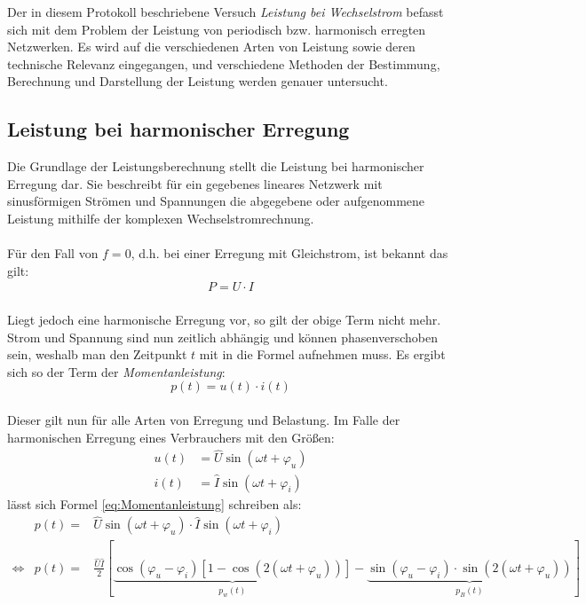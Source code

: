 
Der in diesem Protokoll beschriebene Versuch \textit{Leistung bei Wechselstrom} befasst sich mit dem Problem der Leistung von periodisch bzw. harmonisch erregten Netzwerken. Es wird auf die verschiedenen Arten von Leistung sowie deren technische Relevanz eingegangen, und verschiedene Methoden der Bestimmung, Berechnung und Darstellung der Leistung werden genauer untersucht.

\subsection{Leistung bei harmonischer Erregung}

Die Grundlage der Leistungsberechnung stellt die Leistung bei harmonischer Erregung dar. Sie beschreibt für ein gegebenes lineares Netzwerk mit sinusförmigen Strömen und Spannungen die abgegebene oder aufgenommene Leistung mithilfe der komplexen Wechselstromrechnung.\\
\\
Für den Fall von $f=0$, d.h. bei einer Erregung mit Gleichstrom, ist bekannt das gilt:
\begin{align*}
P=U\cdot I
\end{align*}
\\
Liegt jedoch eine harmonische Erregung vor, so gilt der obige Term nicht mehr. Strom und Spannung sind nun zeitlich abhängig und können phasenverschoben sein, weshalb man den Zeitpunkt $t$ mit in die Formel aufnehmen muss. Es ergibt sich so der Term der \textit{Momentanleistung}:
\begin{equation} \label{eq:Momentanleistung}
p(t)=u(t)\cdot i(t)
\end{equation}
\\
Dieser gilt nun für alle Arten von Erregung und Belastung. Im Falle der harmonischen Erregung eines Verbrauchers mit den Größen:
\begin{align*}
u(t) &= \hat{U}\sin(\omega t + \varphi_u)\\
i(t) &= \hat{I}\sin(\omega t + \varphi_i)
\end{align*}
lässt sich Formel \eqref{eq:Momentanleistung} schreiben als:
\begin{eqnarray}
&p(t)=&\hat{U}\sin(\omega t + \varphi_u) \cdot \hat{I}\sin(\omega t + \varphi_i) \nonumber \\
\Leftrightarrow & p(t) =&\frac{\hat{U}\hat{I}}{2}\left[\underbrace{\cos(\varphi_u-\varphi_i)[1-\cos(2(\omega t + \varphi_u))]}_{p_w(t)}-\underbrace{\sin(\varphi_u-\varphi_i)\cdot\sin(2(\omega t + \varphi_u))}_{p_B(t)}\right] \label{eq:MomLeistungSplit}
\end{eqnarray}

